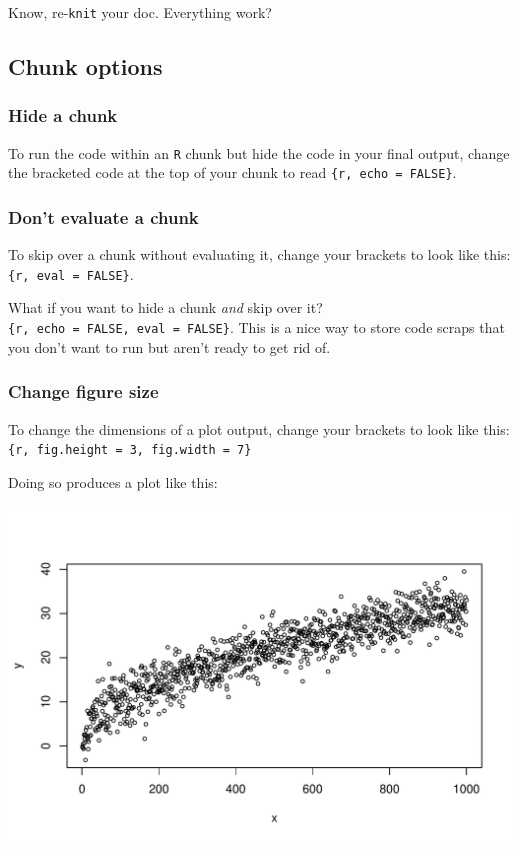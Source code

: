 \documentclass[
]{book}
\begin{document}
Know, re-\texttt{knit} your doc. Everything work?

\hypertarget{chunk-options}{%
\subsection*{Chunk options}\label{chunk-options}}

\hypertarget{hide-a-chunk}{%
\subsubsection*{Hide a chunk}\label{hide-a-chunk}}

To run the code within an \texttt{R} chunk but hide the code in your final output, change the bracketed code at the top of your chunk to read \texttt{\{r,\ echo\ =\ FALSE\}}.

\hypertarget{dont-evaluate-a-chunk}{%
\subsubsection*{Don't evaluate a chunk}\label{dont-evaluate-a-chunk}}

To skip over a chunk without evaluating it, change your brackets to look like this: \texttt{\{r,\ eval\ =\ FALSE\}}.

What if you want to hide a chunk \emph{and} skip over it? \texttt{\{r,\ echo\ =\ FALSE,\ eval\ =\ FALSE\}}. This is a nice way to store code scraps that you don't want to run but aren't ready to get rid of.

\hypertarget{change-figure-size}{%
\subsubsection*{Change figure size}\label{change-figure-size}}

To change the dimensions of a plot output, change your brackets to look like this:
\texttt{\{r,\ fig.height\ =\ 3,\ fig.width\ =\ 7\}}

Doing so produces a plot like this:

\includegraphics[width=504px]{figures/unnamed-chunk-213-1}
\end{document}
